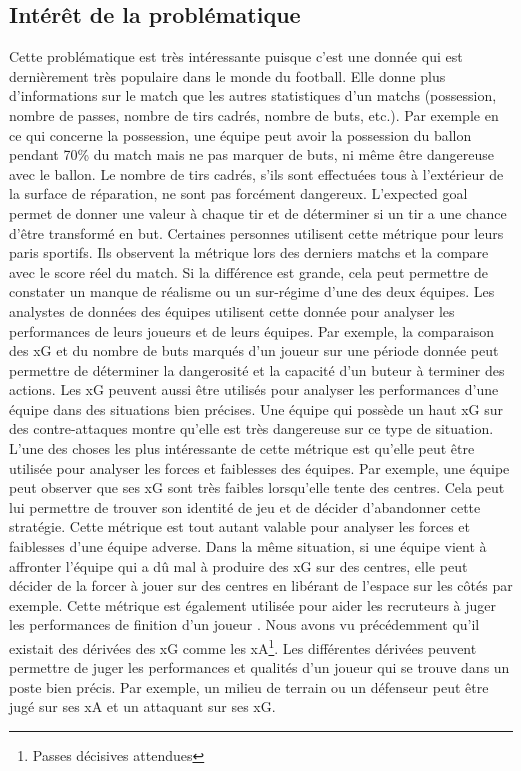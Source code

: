 \documentclass[12pt]{article}
\begin{document}
\subsection{Intérêt de la problématique}
\noindent Cette problématique est très intéressante puisque c'est une donnée qui est dernièrement très populaire dans le monde du football. Elle donne plus d'informations sur le match que les autres statistiques d'un matchs (possession, nombre de passes, nombre de tirs cadrés, nombre de buts, etc.). Par exemple en ce qui concerne la possession, une équipe peut avoir la possession du ballon pendant 70\% du match mais ne pas marquer de buts, ni même être dangereuse avec le ballon. Le nombre de tirs cadrés, s'ils sont effectuées tous à l'extérieur de la surface de réparation, ne sont pas forcément dangereux. L'expected goal permet de donner une valeur à chaque tir et de déterminer si un tir a une chance d'être transformé en but.
\newline \newline
Certaines personnes utilisent cette métrique pour leurs paris sportifs. Ils observent la métrique lors des derniers matchs et la compare avec le score réel du match. Si la différence est grande, cela peut permettre de constater un manque de réalisme ou un sur-régime d'une des deux équipes. \cite{tennerelBienUtiliserExpected2022a}
\newline \newline
Les analystes de données des équipes utilisent cette donnée pour analyser les performances de leurs joueurs et de leurs équipes. Par exemple, la comparaison des xG et du nombre de buts marqués d'un joueur sur une période donnée peut permettre de déterminer la dangerosité et la capacité d'un buteur à terminer des actions. \cite{pettyWhatExpectedGoals2018a}
Les xG peuvent aussi être utilisés pour analyser les performances d'une équipe dans des situations bien précises. Une équipe qui possède un haut xG sur des contre-attaques montre qu'elle est très dangereuse sur ce type de situation. \cite{XGExplainedFBrefa}
L'une des choses les plus intéressante de cette métrique est qu'elle peut être utilisée pour analyser les forces et faiblesses des équipes. Par exemple, une équipe peut observer que ses xG sont très faibles lorsqu'elle tente des centres. Cela peut lui permettre de trouver son identité de jeu et de décider d'abandonner cette stratégie. Cette métrique est tout autant valable pour analyser les forces et faiblesses d'une équipe adverse. Dans la même situation, si une équipe vient à affronter l'équipe qui a dû mal à produire des xG sur des centres, elle peut décider de la forcer à jouer sur des centres en libérant de l'espace sur les côtés par exemple.
\newline \newline
Cette métrique est également utilisée pour aider les recruteurs à juger les performances de finition d'un joueur \cite{garratt-stanleyWhatExpectedGoals2022}. Nous avons vu précédemment qu'il existait des dérivées des xG comme les xA\footnote{Passes décisives attendues}. Les différentes dérivées peuvent permettre de juger les performances et qualités d'un joueur qui se trouve dans un poste bien précis. Par exemple, un milieu de terrain ou un défenseur peut être jugé sur ses xA et un attaquant sur ses xG.
\end{document}
